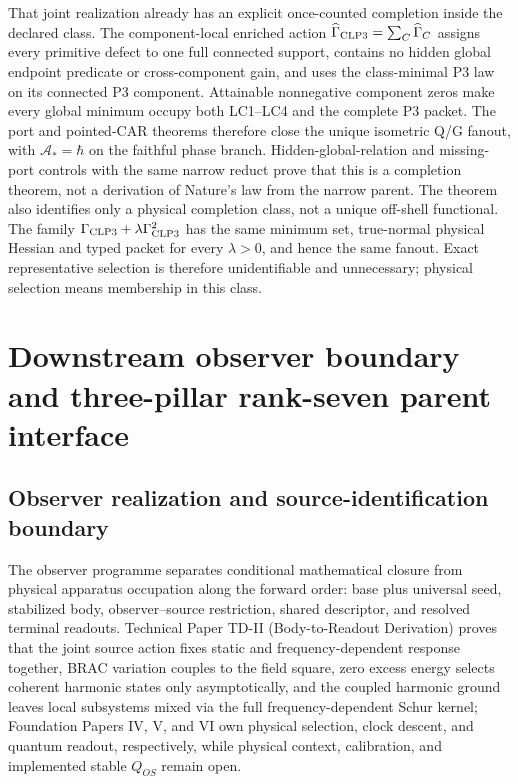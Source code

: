 \documentclass[11pt]{article}
\begin{document}
That joint realization already has an explicit once-counted completion inside
the declared class. The component-local enriched action
$\widehat\Gamma_{\rm CLP3}=\sum_C\widehat\Gamma_C$ assigns every primitive
defect to one full connected support, contains no hidden global endpoint
predicate or cross-component gain, and uses the class-minimal P3 law on its
connected P3 component. Attainable nonnegative component zeros make every
global minimum occupy both LC1--LC4 and the complete P3 packet. The port and
pointed-CAR theorems therefore close the unique isometric Q/G fanout, with
$\mathcal A_*=\hbar$ on the faithful phase branch. Hidden-global-relation and
missing-port controls with the same narrow reduct prove that this is a
completion theorem, not a derivation of Nature's law from the narrow parent.
The theorem also identifies only a physical completion class, not a unique
off-shell functional.  The family
$\Gamma_{\rm CLP3}+\lambda\Gamma_{\rm CLP3}^2$ has the same minimum set,
true-normal physical Hessian and typed packet for every $\lambda>0$, and hence
the same fanout.  Exact representative selection is therefore unidentifiable
and unnecessary; physical selection means membership in this class.

\section{Downstream observer boundary and three-pillar rank-seven parent interface}
\label{sec:downstream-viib-interface}

\subsection{Observer realization and source-identification boundary}
\label{sec:observer-update-20260914}
The observer programme separates conditional mathematical closure from physical apparatus occupation along the forward order: base plus universal seed, stabilized body, observer--source restriction, shared descriptor, and resolved terminal readouts. Technical Paper TD-II (Body-to-Readout Derivation) proves that the joint source action fixes static and frequency-dependent response together, BRAC variation couples to the field square, zero excess energy selects coherent harmonic states only asymptotically, and the coupled harmonic ground leaves local subsystems mixed via the full frequency-dependent Schur kernel; Foundation Papers IV, V, and VI own physical selection, clock descent, and quantum readout, respectively, while physical context, calibration, and implemented stable $Q_{OS}$ remain open.
\end{document}
